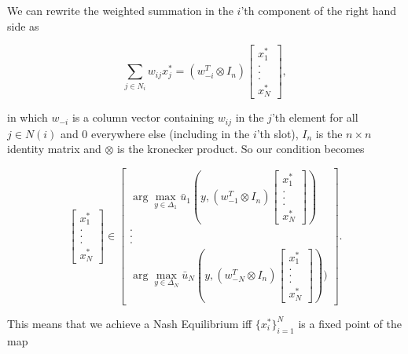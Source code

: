 \documentclass{article}
\theoremstyle{definition}
\begin{document}
	We can rewrite the weighted summation in the $i$'th component of the right hand side as 
	
	\begin{equation}
		\sum_{j \in N_i} w_{ij} x_j^* = (w_{-i}^T \otimes I_n) \begin{bmatrix}
			x_1^* \\ . \\ . \\ . \\ x_N^*
		\end{bmatrix},
	\end{equation}

	in which $w_{-i}$ is a column vector containing $w_{ij}$ in the $j$'th element for all $j \in N(i)$ and 0 everywhere else (including in the $i$'th slot), $I_n$ is the $n \times n$ identity matrix and $\otimes$ is the kronecker product. So our condition becomes
	
	\begin{equation}
		\begin{bmatrix}
			x_1^* \\ . \\ . \\ . \\ x_N^*
		\end{bmatrix} \in
		\begin{bmatrix}
			\arg\max_{y \in \Delta_1} \bar{u}_1(y, (w_{-1}^T \otimes I_n) \begin{bmatrix}
				x_1^* \\ . \\ . \\ . \\ x_N^*
			\end{bmatrix}) \\ . \\ . \\ . \\ \arg\max_{y \in \Delta_N} \bar{u}_N(y, (w_{-N}^T \otimes I_n) \begin{bmatrix}
			x_1^* \\ . \\ . \\ . \\ x_N^*
		\end{bmatrix}))
		\end{bmatrix}	.
	\end{equation}

	This means that we achieve a Nash Equilibrium iff $\{ x_i^*\}_{i = 1}^N$ is a fixed point of the map
	
\end{document}
